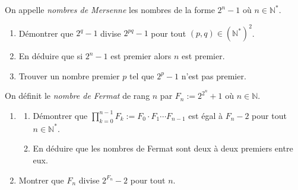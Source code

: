 \begin{exo}\label{exo:arith-40}
	On appelle \emph{nombres de Mersenne} les nombres de la forme $2^n - 1$ o\`u $n \in \mathbb{N}^*$.
	\begin{enumerate}
		\item D\'emontrer que $2^q - 1$ divise $2^{pq} - 1$ pour tout $(p,q) \in (\mathbb{N}^*)^2$.
		\item En d\'eduire que si $2^n - 1$ est premier alors $n$ est premier.
		\item Trouver un nombre premier $p$ tel que $2^p - 1$ n'est pas premier.
	\end{enumerate}
\end{exo}
%
\begin{exo}\label{exo:arith-42}
	On d\'efinit le \emph{nombre de Fermat} de rang $n$ par $F_n := 2^{2^n} + 1$ o\`u $n \in \mathbb{N}$.
	\begin{enumerate}
		\item
			\begin{enumerate}
				\item D\'emontrer que $\prod_{k = 0}^{n -1} F_k := F_0 \cdot F_1 \cdots F_{n-1}$ 
					est \'egal \`a $F_n - 2$ pour tout $n\in\mathbb{N}^*$.
				\item En d\'eduire que les nombres de Fermat sont deux \`a deux premiers entre eux.
			\end{enumerate}
		\item Montrer que $F_n$ divise $2^{F_n} - 2$ pour tout $n$.
	\end{enumerate}
%	
\end{exo}

